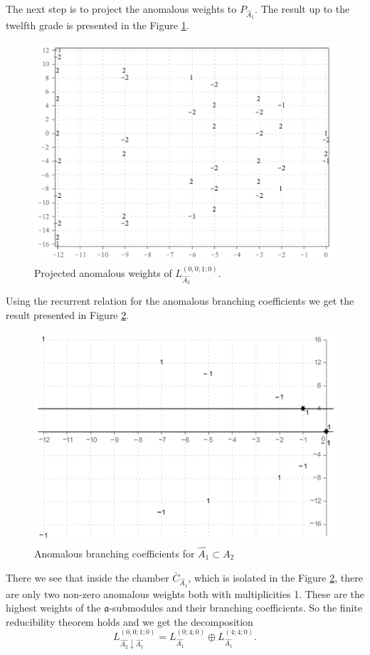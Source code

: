 \documentclass[a4paper,12pt]{article}
\theoremstyle{definition} \newtheorem{Def}{Definition}
\begin{document}
The next step is to project the anomalous weights to $P_{\hat A_1}$.
The result up to the twelfth grade is presented in the Figure \ref{fig:AffineA2_A1_anom_proj}.
\begin{figure}[h!tb]
  \centering
  \includegraphics[width=130mm]{AffineA2_A1_proj_anom.pdf}
  \caption{Projected anomalous weights of $L^{(0,0;1;0)}_{\hat{A_2}}$.}
  \label{fig:AffineA2_A1_anom_proj}
\end{figure}


Using the recurrent relation for the anomalous branching coefficients we get the result presented in Figure \ref{fig:AffineA2_A1_branching}. 
\begin{figure}[h!tb]
  \centering
  \includegraphics[width=130mm]{AffineA2_A1_branching.pdf}
  \caption{Anomalous branching coefficients for $\hat{A_1}\subset \hat{A_2}$}
  \label{fig:AffineA2_A1_branching}
\end{figure}
There we see that inside the chamber $\bar{C}_{\hat{A}_1}$, which is isolated in the
Figure \ref{fig:AffineA2_A1_branching}, there are only two non-zero anomalous weights
both with multiplicities 1.
These are the highest weights of the $\mathfrak{a}$-submodules and their branching
coefficients. So the finite reducibility theorem holds and we get the decomposition
\begin{equation}
  \label{eq:43}
  L^{(0,0;1;0)}_{\hat{A_2}\downarrow \hat{A_1}}= L_{\hat{A_1}}^{(0;4;0)}\oplus L_{\hat{A_1}}^{(4;4;0)}.
\end{equation}
\end{document}
